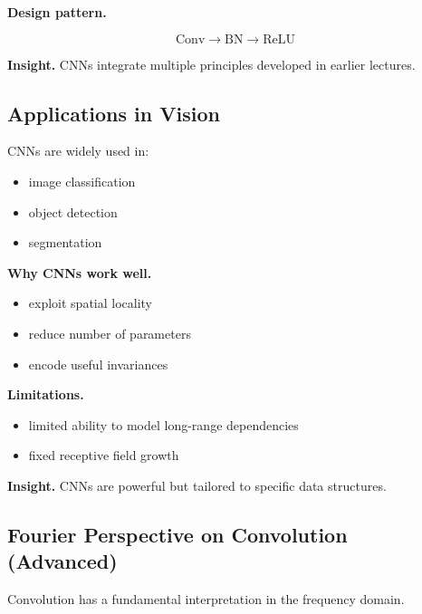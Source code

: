 \medskip

\noindent
\textbf{Design pattern.}

\[
\text{Conv} \rightarrow \text{BN} \rightarrow \text{ReLU}
\]

\medskip

\noindent
\textbf{Insight.}  
CNNs integrate multiple principles developed in earlier lectures.

\subsection{Applications in Vision}

CNNs are widely used in:

\begin{itemize}
    \item image classification
    \item object detection
    \item segmentation
\end{itemize}

\medskip

\noindent
\textbf{Why CNNs work well.}

\begin{itemize}
    \item exploit spatial locality
    \item reduce number of parameters
    \item encode useful invariances
\end{itemize}

\medskip

\noindent
\textbf{Limitations.}

\begin{itemize}
    \item limited ability to model long-range dependencies
    \item fixed receptive field growth
\end{itemize}

\medskip

\noindent
\textbf{Insight.}  
CNNs are powerful but tailored to specific data structures.

\subsection{Fourier Perspective on Convolution (Advanced)}

Convolution has a fundamental interpretation in the frequency domain.

\medskip

